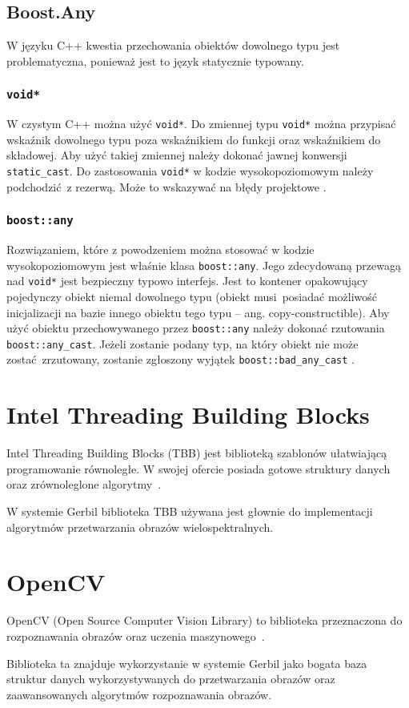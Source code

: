 \subsection{Boost.Any}
W języku C++ kwestia przechowania obiektów dowolnego typu jest problematyczna, ponieważ jest to język statycznie typowany. 

\subsubsection{\lstinline$void*$}
W czystym C++ można użyć \lstinline$void*$. Do zmiennej typu \lstinline$void*$ można przypisać wskaźnik dowolnego typu poza wskaźnikiem do funkcji oraz wskaźnikiem do składowej. Aby użyć takiej zmiennej należy dokonać jawnej konwersji \lstinline$static_cast$. Do zastosowania \lstinline$void*$ w kodzie wysokopoziomowym należy podchodzić z rezerwą. Może to wskazywać na błędy projektowe \cite{Stroustrup}.

\subsubsection{\lstinline$boost::any$}
Rozwiązaniem, które z powodzeniem można stosować w kodzie wysokopoziomowym jest właśnie klasa \lstinline$boost::any$. Jego zdecydowaną przewagą nad \lstinline$void*$ jest bezpieczny typowo interfejs. Jest to kontener opakowujący pojedynczy obiekt niemal dowolnego typu (obiekt musi posiadać możliwość inicjalizacji na bazie innego obiektu tego typu -- ang. copy-constructible).
Aby użyć obiektu przechowywanego przez \lstinline$boost::any$ należy dokonać rzutowania \lstinline$boost::any_cast$. Jeżeli zostanie podany typ, na który obiekt nie może zostać zrzutowany, zostanie zgłoszony wyjątek \lstinline$boost::bad_any_cast$ \cite{boost}.

 \section{Intel Threading Building Blocks}
Intel Threading Building Blocks (TBB) jest biblioteką szablonów ułatwiającą programowanie równoległe. W swojej ofercie posiada gotowe struktury danych oraz zrównoleglone algorytmy~\cite{tbb}.

W systemie Gerbil biblioteka TBB używana jest głownie do implementacji algorytmów przetwarzania obrazów wielospektralnych.

 \section{OpenCV}
OpenCV (Open Source Computer Vision Library) to biblioteka przeznaczona do rozpoznawania obrazów oraz uczenia maszynowego~\cite{opencv}.

Biblioteka ta znajduje wykorzystanie w systemie Gerbil jako bogata baza struktur danych wykorzystywanych do przetwarzania obrazów oraz zaawansowanych algorytmów rozpoznawania obrazów.